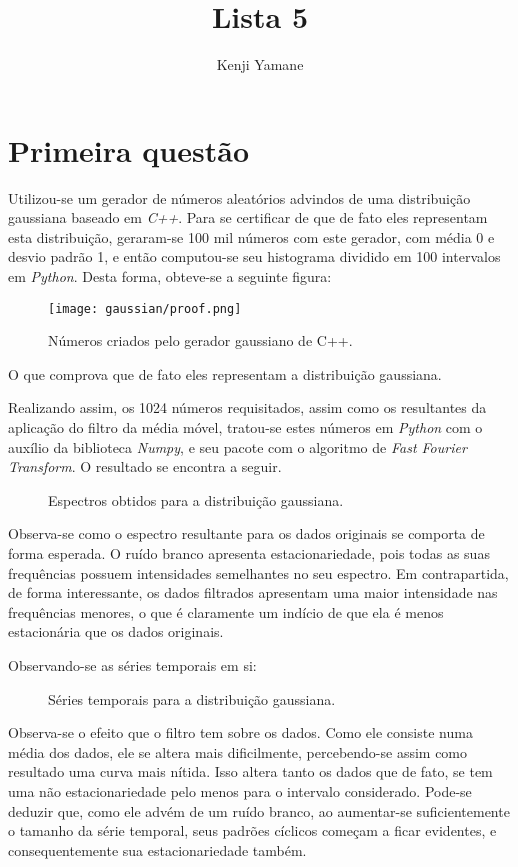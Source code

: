 \documentclass{article}[twocolumn]
\title{Lista 5}
\author{Kenji Yamane}
\begin{document}
	\maketitle
	\section{Primeira quest\~ao}
	Utilizou-se um gerador de n\'umeros aleat\'orios advindos de uma distribui\c{c}\~ao
	gaussiana baseado em \textit{C++}. Para se certificar de que de fato eles representam esta
	distribui\c{c}\~ao, geraram-se 100 mil n\'umeros com este gerador, com m\'edia 0
	e desvio padr\~ao 1, e ent\~ao computou-se seu histograma dividido em 100 intervalos
	em \textit{Python}. Desta forma, obteve-se a seguinte figura:
	\begin{figure}[H]
		\centering
		\texttt{[image: gaussian/proof.png]}
		\caption{N\'umeros criados pelo gerador gaussiano de C++.}
	\end{figure}
	O que comprova que de fato eles representam a distribui\c{c}\~ao gaussiana.

	Realizando assim, os 1024 n\'umeros requisitados, assim como os resultantes da aplica\c{c}\~ao
	do filtro da m\'edia m\'ovel, tratou-se estes n\'umeros em \textit{Python} com o aux\'ilio
	da biblioteca \textit{Numpy}, e seu pacote com o algoritmo de \textit{Fast Fourier Transform}.
	O resultado se encontra a seguir.
	\begin{figure}[H]
		\centering
		\caption{Espectros obtidos para a distribui\c{c}\~ao gaussiana.}
	\end{figure}
	Observa-se como o espectro resultante para os dados originais se comporta de forma esperada.
	O ru\'ido branco apresenta estacionariedade, pois todas as suas frequ\^encias possuem
	intensidades semelhantes no seu espectro. Em contrapartida, de forma interessante, os
	dados filtrados apresentam uma maior intensidade nas frequ\^encias menores, o que \'e
	claramente um ind\'icio de que ela \'e menos estacion\'aria que os dados originais.

	Observando-se as s\'eries temporais em si:
	\begin{figure}[H]
		\centering
		\caption{S\'eries temporais para a distribui\c{c}\~ao gaussiana.}
	\end{figure}
	Observa-se o efeito que o filtro tem sobre os dados. Como ele consiste numa m\'edia dos
	dados, ele se altera mais dificilmente, percebendo-se assim como resultado uma curva mais
	n\'itida. Isso altera tanto os dados que de fato, se tem uma n\~ao estacionariedade
	pelo menos para o intervalo considerado. Pode-se deduzir que, como ele adv\'em de um
	ru\'ido branco, ao aumentar-se suficientemente o tamanho da s\'erie temporal, seus padr\~oes
	c\'iclicos come\c{c}am a ficar evidentes, e consequentemente sua estacionariedade tamb\'em.
\end{document}
